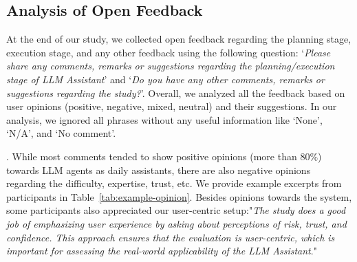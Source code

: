 \subsection{Analysis of Open Feedback} At the end of our study, we collected open feedback regarding the planning stage, execution stage, and any other feedback using the following question: %
`\textit{Please share any comments, remarks or suggestions regarding the planning/execution stage of LLM Assistant}' and `\textit{Do you have any other comments, remarks or suggestions regarding the study?}'. 
Overall, we analyzed all the feedback based on user opinions (positive, negative, mixed, neutral) and their suggestions. 
In our analysis, we ignored all phrases without any useful information like `None', `N/A', and `No comment'. 

. While most comments tended to show positive opinions (more than $80\%$) towards LLM agents as daily assistants, there are also negative opinions regarding the difficulty, expertise, trust, etc. We provide example excerpts from participants in Table~\ref{tab:example-opinion}. Besides opinions towards the system, some participants also appreciated our user-centric setup:"\textit{The study does a good job of emphasizing user experience by asking about perceptions of risk, trust, and confidence. This approach ensures that the evaluation is user-centric, which is important for assessing the real-world applicability of the LLM Assistant}."

